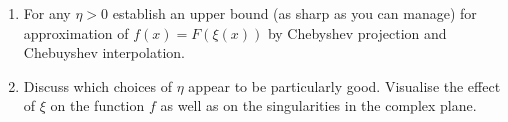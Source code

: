 \begin{exercise}
\begin{enumerate}
      \begin{enumerate} \alist 
         \item For any $\eta > 0$ establish an upper bound (as sharp as you can
         manage) for approximation of $f(x) = F(\xi(x))$ by Chebyshev projection
         and Chebuyshev interpolation.
         
         \item Discuss which choices of $\eta$ appear to be particularly good.
         Visualise the effect of $\xi$ on the function $f$ as well as on 
         the singularities in the complex plane.
      \end{enumerate}
   \end{enumerate}
\end{exercise}

